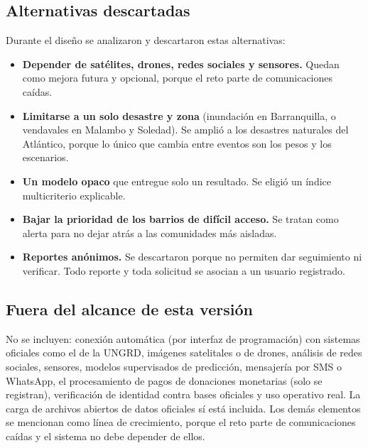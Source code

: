 \subsection{Alternativas descartadas}
Durante el diseño se analizaron y descartaron estas alternativas:
\begin{itemize}
  \item \textbf{Depender de satélites, drones, redes sociales y sensores.} Quedan como mejora futura y opcional, porque el reto parte de comunicaciones caídas.
  \item \textbf{Limitarse a un solo desastre y zona} (inundación en Barranquilla, o vendavales en Malambo y Soledad). Se amplió a los desastres naturales del Atlántico, porque lo único que cambia entre eventos son los pesos y los escenarios.
  \item \textbf{Un modelo opaco} que entregue solo un resultado. Se eligió un índice multicriterio explicable.
  \item \textbf{Bajar la prioridad de los barrios de difícil acceso.} Se tratan como alerta para no dejar atrás a las comunidades más aisladas.
  \item \textbf{Reportes anónimos.} Se descartaron porque no permiten dar seguimiento ni verificar. Todo reporte y toda solicitud se asocian a un usuario registrado.
\end{itemize}

\subsection{Fuera del alcance de esta versión}\label{sec:fuera}
No se incluyen: conexión automática (por interfaz de programación) con sistemas oficiales como el de la UNGRD, imágenes satelitales o de drones, análisis de redes sociales, sensores, modelos supervisados de predicción, mensajería por SMS o WhatsApp, el procesamiento de pagos de donaciones monetarias (solo se registran), verificación de identidad contra bases oficiales y uso operativo real. La carga de archivos abiertos de datos oficiales sí está incluida. Los demás elementos se mencionan como línea de crecimiento, porque el reto parte de comunicaciones caídas y el sistema no debe depender de ellos.
